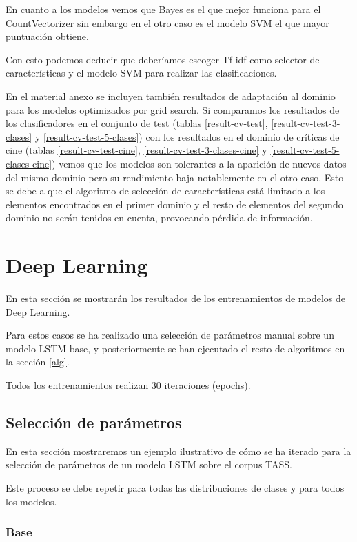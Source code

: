 En cuanto a los modelos vemos que Bayes es el que mejor funciona para el CountVectorizer sin embargo en el otro caso es el modelo SVM el que mayor puntuación obtiene.

Con esto podemos deducir que deberíamos escoger Tf-idf como selector de características y el modelo SVM para realizar las clasificaciones.

En el material anexo se incluyen también resultados de adaptación al dominio para los modelos optimizados por grid search. Si comparamos los resultados de los clasificadores en el conjunto de test (tablas \ref{result-cv-test}, \ref{result-cv-test-3-clases} y \ref{result-cv-test-5-clases}) con los resultados en el dominio de críticas de cine (tablas \ref{result-cv-test-cine}, \ref{result-cv-test-3-clases-cine} y \ref{result-cv-test-5-clases-cine}) vemos que los modelos son tolerantes a la aparición de nuevos datos del mismo dominio pero su rendimiento baja notablemente en el otro caso. Esto se debe a que el algoritmo de selección de características está limitado a los elementos encontrados en el primer dominio y el resto de elementos del segundo dominio no serán tenidos en cuenta, provocando pérdida de información.


\section{Deep Learning}

En esta sección se mostrarán los resultados de los entrenamientos de modelos de Deep Learning.

Para estos casos se ha realizado una selección de parámetros manual sobre un modelo LSTM base, y posteriormente se han ejecutado el resto de algoritmos en la sección \ref{alg}. 

Todos los entrenamientos realizan 30 iteraciones (epochs).

\subsection{Selección de parámetros}

En esta sección mostraremos un ejemplo ilustrativo de cómo se ha iterado para la selección de parámetros de un modelo LSTM sobre el corpus TASS.

Este proceso se debe repetir para todas las distribuciones de clases y para todos los modelos.

\subsubsection{Base}

